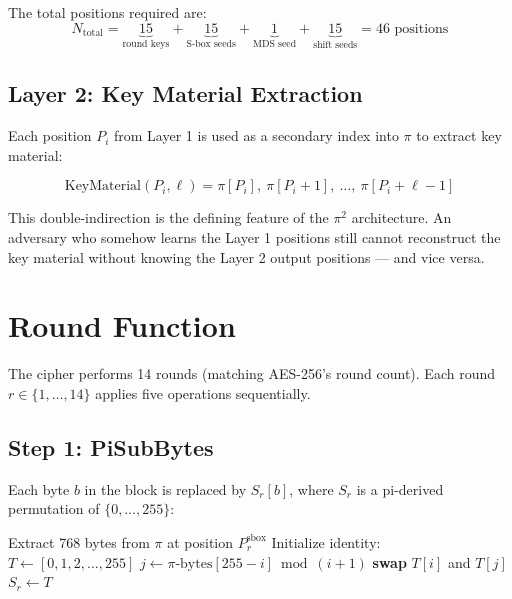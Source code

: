 \documentclass[12pt, a4paper]{article}
\begin{document}
The total positions required are:
\begin{equation}
  N_{\text{total}} = \underbrace{15}_{\text{round keys}} + \underbrace{15}_{\text{S-box seeds}} + \underbrace{1}_{\text{MDS seed}} + \underbrace{15}_{\text{shift seeds}} = 46 \text{ positions}
\end{equation}

\subsection{Layer 2: Key Material Extraction}

Each position $P_i$ from Layer 1 is used as a secondary index into $\pi$ to extract key material:

\begin{equation}
  \text{KeyMaterial}(P_i, \ell) = \pi[P_i],\ \pi[P_i+1],\ \ldots,\ \pi[P_i + \ell - 1]
\end{equation}

This double-indirection is the defining feature of the $\pi^2$ architecture. An adversary who somehow learns the Layer 1 positions still cannot reconstruct the key material without knowing the Layer 2 output positions — and vice versa.

\section{Round Function}

The cipher performs 14 rounds (matching AES-256's round count). Each round $r \in \{1, \ldots, 14\}$ applies five operations sequentially.

\subsection{Step 1: PiSubBytes}

Each byte $b$ in the block is replaced by $S_r[b]$, where $S_r$ is a pi-derived permutation of $\{0, \ldots, 255\}$:

\begin{algorithm}[H]
\caption{PiSubBytes S-box Generation for Round $r$}
\begin{algorithmic}[1]
\State Extract 768 bytes from $\pi$ at position $P^{\text{sbox}}_r$
\State Initialize identity: $T \leftarrow [0, 1, 2, \ldots, 255]$
 
    \State $j \leftarrow \pi\text{-bytes}[255 - i] \bmod (i+1)$
    \State \textbf{swap} $T[i]$ and $T[j]$
\EndFor
\State $S_r \leftarrow T$ 
\end{algorithmic}
\end{algorithm}
\end{document}
